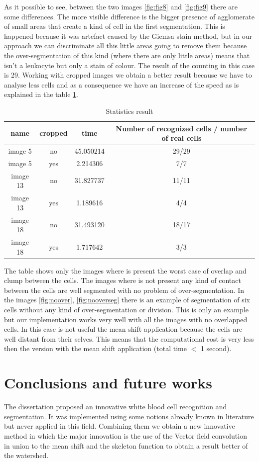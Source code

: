 As it possible to see, between the two images \ref{fig:fig8} and \ref{fig:fig9} there are some differences. The more visible difference is the bigger presence of agglomerate of small areas that create a kind of cell in the first segmentation. This is happened because it was artefact caused by the Giemsa stain method, but in our approach we can discriminate all this little areas going to remove them because the over-segmentation of this kind (where there are only little areas) means that isn't a leukocyte but only a stain of colour. The result of the counting in this case is 29. 
Working with cropped images we obtain a better result because we have to analyse less cells and as a consequence we have an increase of the speed as is explained in the table \ref{statistics}.
\begin{table}
\centering
\begin{tabular}{|c|c|c|c|}
\hline 
name & cropped & time & Number of recognized cells / number of real cells\\ 
\hline 
image 5 & no & 45.050214 & 29/29\\ 
\hline 
image 5 & yes & 2.214306 & 7/7\\ 
\hline 
image 13 & no & 31.827737 & 11/11 \\ 
\hline 
image 13 & yes & 1.189616 & 4/4 \\ 
\hline 
image 18 & no & 31.493120 & 18/17\\ 
\hline 
image 18 & yes & 1.717642 & 3/3 \\ 
\hline 
\end{tabular} 
\caption{Statistics result}
\label{statistics}
\end{table}
The table shows only the images where is present the worst case of overlap and clump between the cells. The images where is not present any kind of contact between the cells are well segmented with no problem of over-segmentation. In the images  \ref{fig:noover}, \ref{fig:nooverseg} there is an example of segmentation of six cells without any kind of over-segmentation or division. This is only an example but our implementation works very well with all the images with no overlapped cells. In this case is not useful the mean shift application because the cells are well distant from their selves. This means that the computational cost is very less then the version with the mean shift application (total time $<$ 1 second).

\section{Conclusions and future works}
The dissertation proposed an innovative white blood cell recognition and segmentation. It was implemented using some notions already known in literature but never applied in this field. Combining them we obtain a new innovative method in which the major innovation is the use of the Vector field convolution in union to the mean shift and the skeleton function to obtain a result better of the watershed.

